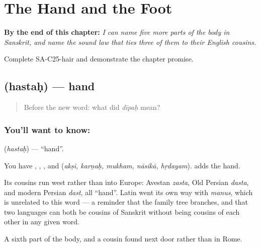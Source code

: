 
\chapter{The Hand and the Foot}
\label{ch:sa-body-more}

\begin{chapteropening}
\textbf{By the end of this chapter:} \emph{I can name five more parts of the body in Sanskrit, and name the sound law that ties three of them to their English cousins.}

Complete SA-C25-hair and demonstrate the chapter promise.
\end{chapteropening}

\section[\texorpdfstring{\sk{हस्तः} (hastaḥ)}{हस्तः (hastaḥ)}]{ (hastaḥ) — hand}

\label{lesson:SA-C25-hand}



\begin{quote}
Before the new word: what did \emph{dīpaḥ} mean?
\end{quote}

\subsection*{You'll want to know: }
\textbf{} (\emph{hastaḥ}) — \textquotedblleft{}hand\textquotedblright{}.

You have , , ,  and  (\emph{akṣi, karṇaḥ, mukham, nāsikā, hṛdayam}). \textbf{} adds the hand.

Its cousins run west rather than into Europe: Avestan \emph{zasta}, Old Persian \emph{dasta}, and modern Persian \emph{dast}, all \textquotedblleft{}hand\textquotedblright{}. Latin went its own way with \emph{manus}, which is unrelated to this word — a reminder that the family tree branches, and that two languages can both be cousins of Sanskrit without being cousins of each other in any given word.

\begin{grammarlens}[title={What you've built}]
A sixth part of the body, and a cousin found next door rather than in Rome.
\end{grammarlens}

